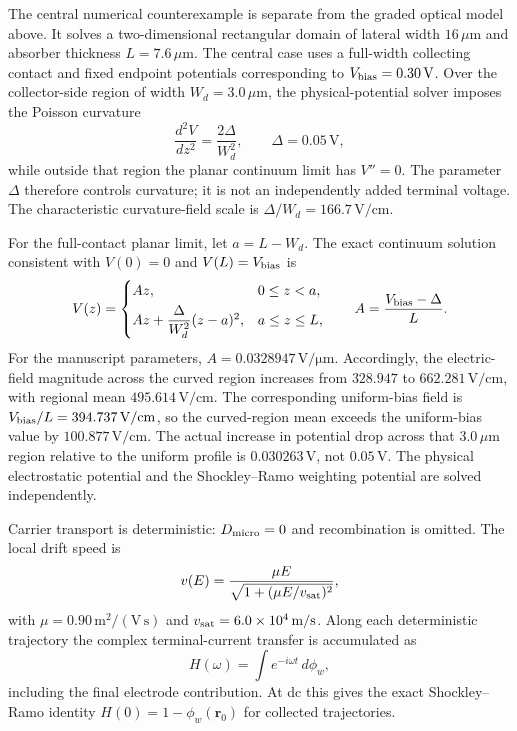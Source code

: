 \documentclass[aps,pra,onecolumn,superscriptaddress,nofootinbib]{revtex4-2}
\begin{document}
The central numerical counterexample is separate from the graded optical model above.  It solves a two-dimensional rectangular domain of lateral width $16\,\mu\mathrm{m}$ and absorber thickness $L=7.6\,\mu\mathrm{m}$.  The central case uses a full-width collecting contact and fixed endpoint potentials corresponding to $V_{\rm bias}=0.30\,\mathrm{V}$.  Over the collector-side region of width $W_d=3.0\,\mu\mathrm{m}$, the physical-potential solver imposes the Poisson curvature
\begin{equation}
\frac{d^2V}{dz^2}=\frac{2\Delta}{W_d^2},
\qquad \Delta=0.05\,\mathrm{V},
\end{equation}
while outside that region the planar continuum limit has $V''=0$.  The parameter $\Delta$ therefore controls curvature; it is not an independently added terminal voltage.  The characteristic curvature-field scale is $\Delta/W_d=166.7\,\mathrm{V/cm}$.

For the full-contact planar limit, let $a=L-W_d$.  The exact continuum solution consistent with $V(0)=0$ and $V(L)=V_{\rm bias}$ is
\begin{equation}
V(z)=
\begin{cases}
Az, & 0\le z<a,\\[3pt]
Az+\dfrac{\Delta}{W_d^2}(z-a)^2, & a\le z\le L,
\end{cases}
\qquad
A=\frac{V_{\rm bias}-\Delta}{L}.
\label{eq:planar-poisson}
\end{equation}
For the manuscript parameters, $A=0.0328947\,\mathrm{V/\mu m}$.  Accordingly, the electric-field magnitude across the curved region increases from $328.947$ to $662.281\,\mathrm{V/cm}$, with regional mean $495.614\,\mathrm{V/cm}$.  The corresponding uniform-bias field is $V_{\rm bias}/L=394.737\,\mathrm{V/cm}$, so the curved-region mean exceeds the uniform-bias value by $100.877\,\mathrm{V/cm}$.  The actual increase in potential drop across that $3.0\,\mu\mathrm{m}$ region relative to the uniform profile is $0.030263\,\mathrm{V}$, not $0.05\,\mathrm{V}$.  The physical electrostatic potential and the Shockley--Ramo weighting potential are solved independently.

Carrier transport is deterministic: $D_{\rm micro}=0$ and recombination is omitted.  The local drift speed is
\begin{equation}
v(E)=\frac{\mu E}{\sqrt{1+(\mu E/v_{\rm sat})^2}},
\end{equation}
with $\mu=0.90\,\mathrm{m^2/(V\,s)}$ and $v_{\rm sat}=6.0\times10^4\,\mathrm{m/s}$.  Along each deterministic trajectory the complex terminal-current transfer is accumulated as
\begin{equation}
H(\omega)=\int e^{-i\omega t}\,d\phi_w,
\end{equation}
including the final electrode contribution.  At dc this gives the exact Shockley--Ramo identity $H(0)=1-\phi_w(\mathbf r_0)$ for collected trajectories.
\end{document}
